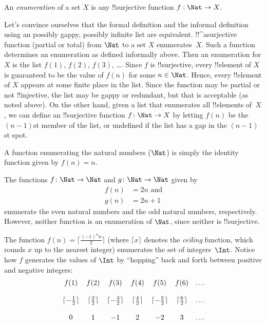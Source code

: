 \documentclass[../../include/open-logic-section]{subfiles}
\begin{document}
\begin{defn}
An \emph{enumeration} of a set $X$ is any !!{surjective} function $f: 
\Nat \rightarrow X$.
\end{defn}

\begin{explain}
Let's convince ourselves that the formal definition and the informal
definition using an possibly gappy, possibly infinite list are
equivalent. !!^a{surjective} function (partial or total) from $\Nat$ to
a set $X$ enumerates~$X$. Such a function determines an enumeration as
defined informally above. Then an enumeration for $X$ is the list
$f(1)$, $f(2)$, $f(3)$, \dots. Since $f$ is !!{surjective}, every
!!{element} of $X$ is guaranteed to be the value of $f(n)$ for some $n
\in \Nat$.  Hence, every !!{element} of $X$ appears at some finite
place in the list. Since the function may be partial or not !!{injective},
the list may be gappy or redundant, but that is acceptable (as noted
above). On the other hand, given a list that enumerates all
!!{element}s of~$X$, we can define an !!{surjective} function $f\colon
\Nat \to X$ by letting $f(n)$ be the $(n-1)$st member of the list, or
undefined if the list has a gap in the $(n-1)$st spot.
\end{explain}

\begin{ex}
A function enumerating the natural numbers ($\Nat$) is 
simply the identity function given by $f(n) = n$.
\end{ex}

\begin{ex}
The functions $f\colon \Nat \to \Nat$ and $g \colon \Nat \to \Nat$ given by
\begin{align}
f(n) & = 2n \text{ and}\\
g(n) & = 2n+1
\end{align}
enumerate the even natural numbers and the odd natural numbers, 
respectively. However, neither function is an enumeration of 
$\Nat$, since neither is !!{surjective}.
\end{ex}

\begin{ex}
The function $f(n) = \lceil \frac{(-1)^n n}{2}\rceil$ (where $\lceil x
\rceil$ denotes the \emph{ceiling} function, which rounds $x$ up to
the nearest integer) enumerates the set of integers~$\Int$. Notice
how $f$ generates the values of $\Int$ by ``hopping'' back and forth
between positive and negative integers: 
\[
\begin{array}{c c c c c c c}
f(1) & f(2) & f(3) & f(4) & f(5) & f(6) & \dots \\ \\
\lceil - \tfrac{1}{2}\rceil & \lceil \tfrac{2}{2} \rceil & \lceil - 
\tfrac{3}{2} \rceil & \lceil \tfrac{4}{2} \rceil  & \lceil -\tfrac{5}{2} 
\rceil & \lceil \tfrac{6}{2} \rceil & \dots \\ \\
0 & 1 & -1 & 2 & -2 & 3 & \dots
\end{array}
\]
\end{ex}
\end{document}

